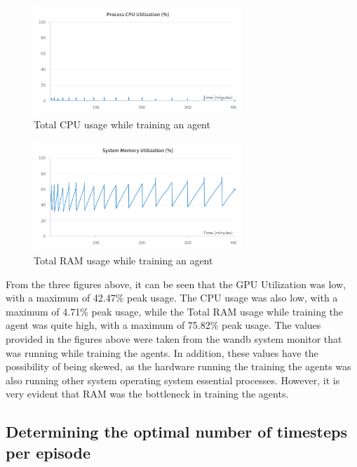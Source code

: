 \begin{figure}[H]
    \centering
    \includegraphics[width=0.7\textwidth]{figures/total_cpu_utilization.png}
    \caption{Total CPU usage while training an agent}
    \label{fig:ram_usage}
\end{figure}

\begin{figure}[H]
    \centering
    \includegraphics[width=0.7\textwidth]{figures/System_RAM_Utilization.png}
    \caption{Total RAM usage while training an agent}
    \label{fig:sys_memory_useage}
\end{figure}

From the three figures above, it can be seen that the GPU Utilization was low, with a maximum of 42.47\% peak usage. The CPU usage was also low, with a maximum of 4.71\% peak usage, while the Total RAM usage while training the agent was quite high, with a maximum of 75.82\% peak usage. The values provided in the figures above were taken from the wandb system monitor that was running while training the agents. In addition, these values have the possibility of being skewed, as the hardware running the training the agents was also running other system operating system essential processes. However, it is very evident that RAM was the bottleneck in training the agents.  

\subsection{Determining the optimal number of timesteps per episode}

